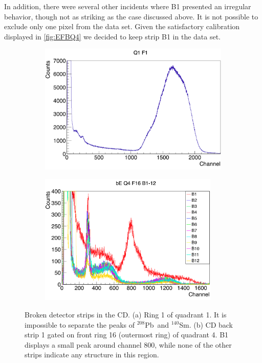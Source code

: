 \documentclass[twoside,english]{uiofysmaster/uiofysmaster}
\newcommand{\Sm}{$^{140}$Sm} %
\newcommand{\Pb}{$^{208}$Pb}
\let\orgautoref\autoref
\renewcommand{\autoref}
        {%
		 \def\sectionautorefname{Section}%
		 \def\subsectionautorefname{Section}%
		 \def\subsubsectionautorefname{Section}%
		 \def\chapterautorefname{Chapter}%
          \orgautoref}
\begin{document}
In addition, there were several other incidents where B1 presented an irregular behavior, though not as striking as the case discussed above.
It is not possible to exclude only one pixel from the data set. 
Given the satisfactory calibration displayed in \autoref{fig:EFBQ4} we decided to keep strip B1 in the data set.

\begin{figure}[ht]
	\centering
	\begin{subfigure}[b]{0.49\textwidth}
		\centering
		\includegraphics[width=\textwidth]{../Plots/plotting/TB_Q1_F1.png}
		\caption{}
		\label{fig:BDS_R1}
	\end{subfigure}
	\hfill
	\begin{subfigure}[b]{0.49\textwidth}
		\centering
		\includegraphics[width=0.94\textwidth]{../Plots/plotting/bE_Q4_f16_b1-12.png}
		\caption{}
		\label{fig:BDS_B1}
	\end{subfigure}
	\caption{Broken detector strips in the CD.
	(a) Ring 1 of quadrant 1. It is impossible to separate the peaks of \Pb\ and \Sm.
	(b) CD back strip 1 gated on front ring 16 (outermost ring) of quadrant 4. 
	B1 displays a small peak around channel 800, while none of the other strips indicate any structure in this region.}
	\label{fig:BDS}
\end{figure}
\end{document}
